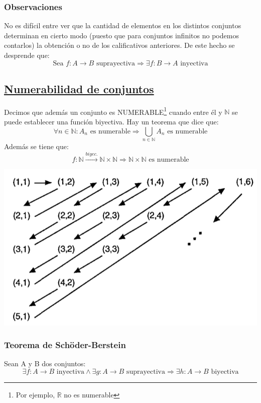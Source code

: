 \documentclass[10pt,a4paper,openright]{book}
\theoremstyle{break}
\begin{document}
\subsubsection{Observaciones}
No es difícil entre ver que la cantidad de elementos en los distintos conjuntos determinan en cierto modo (puesto que  para conjuntos infinitos no podemos contarlos) la obtención o no de los calificativos anteriores. De este hecho se desprende que:
$$\mbox{Sea }f: A\rightarrow B\mbox{ suprayectiva}\Rightarrow \exists f: B\rightarrow A \mbox{ inyectiva} $$
\subsection{\underline{Numerabilidad de conjuntos}}
Decimos que además un conjunto es NUMERABLE\footnote{Por ejemplo, $\mathbb R$ no es numerable} cuando entre él y $\mathbb N$ se puede establecer una función biyectiva. Hay un teorema que dice que:
$$\forall n\in \mathbb N : A_n\mbox{ es numerable}\Rightarrow \bigcup_{n\in \mathbb N} A_n\mbox{ es numerable}$$
Además se tiene que:
$$f:\mathbb N\stackrel{biyec.}{\rightarrow} \mathbb N \times \mathbb N \Rightarrow \mathbb N \times \mathbb N\mbox{ es numerable}$$
\begin{center}
\includegraphics[scale=0.25]{nxn numerable}
\end{center}

\subsubsection{Teorema de Schöder-Berstein}
Sean A y B dos conjuntos:
$$\exists f: A\rightarrow B \mbox{ inyectiva}\wedge \exists g: A\rightarrow B \mbox{ suprayectiva}\Rightarrow \exists h: A\rightarrow B \mbox{ biyectiva}$$
\end{document}
